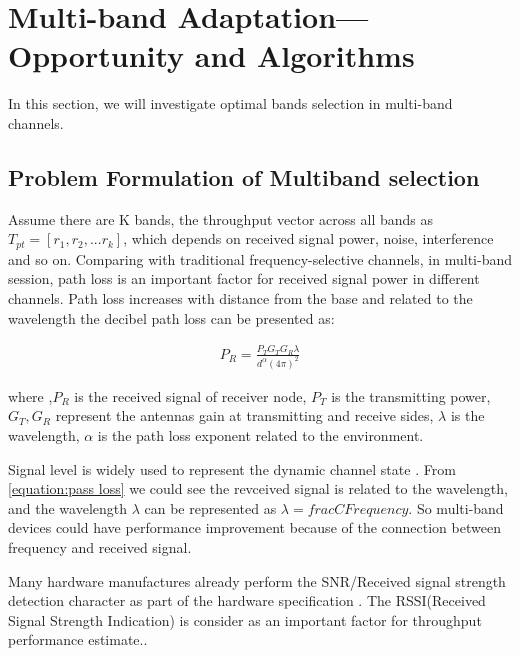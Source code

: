 \section{Multi-band Adaptation---Opportunity and Algorithms}
\label{sec:model}

In this section, we will investigate optimal bands selection in multi-band channels. 

\subsection{Problem Formulation of Multiband selection}
\label{subsec:problem}
Assume there are K bands, the throughput vector across all bands as $T_{pt}=[r_1,r_2,...r_k]$, which depends on received signal power, noise, interference and so on. Comparing with traditional frequency-selective channels, in multi-band session, path loss is an important factor for received signal power in different channels. 
Path loss increases with distance from the base and related to the wavelength the decibel path loss can be presented as:\cite{rappaport}

\begin{align}
\label{euqation:path loss}
P_{R}=\frac{P_TG_TG_R\lambda}{d^\alpha(4\pi)^2}
\end{align}

where ,$P_R$ is the received signal of receiver node, $P_T$ is the transmitting power, $G_T,G_R$ represent the antennas gain at transmitting and receive sides,
$\lambda$ is the wavelength, $\alpha$ is the path loss exponent related to the environment. 

Signal level is widely used to represent the dynamic channel state  \cite{rahul2009frequency}. 
From \ref{equation:pass loss} we could see the revceived signal is related to the wavelength, and the wavelength $\lambda$ can be represented as $\lambda=frac{C}{Frequency}$. So multi-band devices could have performance improvement because of the connection between frequency and received signal.



Many hardware manufactures already perform the SNR/Received signal strength detection character as part of the hardware specification \cite{edalat2006measured}. 
The RSSI(Received Signal Strength Indication) is consider as an important factor for throughput performance estimate.\cite{laneman2000energy,laneman2001efficient}. 


